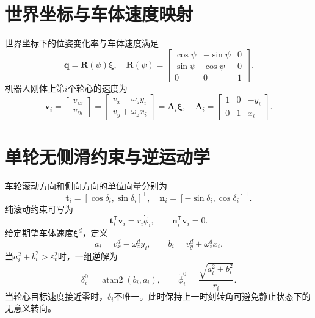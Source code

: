 \documentclass[UTF8,openany,12pt,a4paper]{ctexrep}
\newcommand{\trans}{^{\mathsf T}}
\begin{document}
\section{世界坐标与车体速度映射}
世界坐标下的位姿变化率与车体速度满足
\begin{equation}
\dot{\bm q}=\bm R(\psi)\bm\xi,
\quad \bm R(\psi)=\begin{bmatrix}\cos\psi&-\sin\psi&0\\\sin\psi&\cos\psi&0\\0&0&1\end{bmatrix}.
\label{eq:pose}
\end{equation}
机器人刚体上第$i$个轮心的速度为
\begin{equation}
\bm v_i=\begin{bmatrix}v_{ix}\\v_{iy}\end{bmatrix}
=\begin{bmatrix}v_x-\omega_z y_i\\v_y+\omega_z x_i\end{bmatrix}
=\bm A_i\bm\xi,\quad
\bm A_i=\begin{bmatrix}1&0&-y_i\\0&1&x_i\end{bmatrix}.
\label{eq:wheelcenter}
\end{equation}

\section{单轮无侧滑约束与逆运动学}
车轮滚动方向和侧向方向的单位向量分别为
\begin{equation}
\bm t_i=[\cos\delta_i,\sin\delta_i]\trans,\quad
\bm n_i=[-\sin\delta_i,\cos\delta_i]\trans.
\end{equation}
纯滚动约束可写为
\begin{equation}
\bm t_i\trans\bm v_i=r_i\dot\phi_i,\qquad \bm n_i\trans\bm v_i=0.
\label{eq:rolling}
\end{equation}
给定期望车体速度$\bm\xi^d$，定义
\begin{equation}a_i=v_x^d-\omega_z^d y_i,\qquad b_i=v_y^d+\omega_z^d x_i.\end{equation}
当$a_i^2+b_i^2>\varepsilon_v^2$时，一组逆解为
\begin{equation}
\delta_i^0=\operatorname{atan2}(b_i,a_i),\qquad
\dot\phi_i^0=\frac{\sqrt{a_i^2+b_i^2}}{r_i}.
\label{eq:ik}
\end{equation}
当轮心目标速度接近零时，$\delta_i$不唯一。此时保持上一时刻转角可避免静止状态下的无意义转向。
\end{document}

